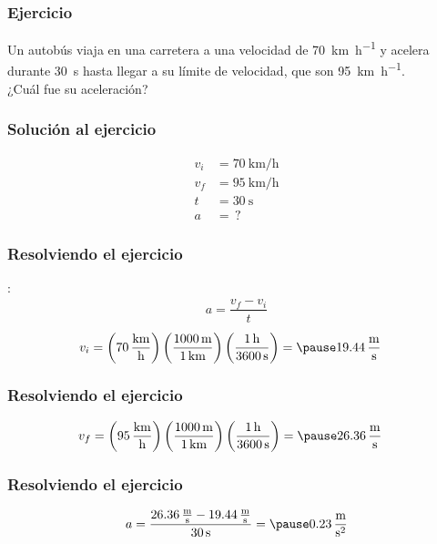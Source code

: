\documentclass[14pt]{beamer}
\begin{document}
\begin{frame}
\frametitle{Ejercicio}
Un autobús viaja en una carretera a una velocidad de \SI{70}{\kilo\meter\per\hour} y acelera durante \SI{30}{\second} hasta llegar a su límite de velocidad, que son \SI{95}{\kilo\meter\per\hour}.
\\
\bigskip
\pause
¿Cuál fue su aceleración?
\end{frame}
\begin{frame}
\frametitle{Solución al ejercicio}
\begin{align*}
v_{i} &= \SI{70}{\kilo\meter\per\hour} \\[0.5em]
v_{f} &= \SI{95}{\kilo\meter\per\hour} \\[0.5em]
t &= \SI{30}{\second} \\[0.5em]
a &= \, ?
\end{align*}
\end{frame}
\begin{frame}
\frametitle{Resolviendo el ejercicio}
:
\pause
\begin{align*}
a = \dfrac{v_{f} - v_{i}}{t}
\end{align*}
\pause
{}
\begin{eqnarray*}
\begin{aligned}
v_{i} &= \left( \SI[per-mode=fraction]{70}{\kilo\meter\per\hour} \right) \left( \dfrac{\SI{1000}{\meter}}{\SI{1}{\kilo\meter}} \right) \left( \dfrac{\SI{1}{\hour}}{\SI{3600}{\second}} \right) = \pause \SI[per-mode=fraction]{19.44}{\meter\per\second}
\end{aligned}
\end{eqnarray*}
\end{frame}
\begin{frame}
\frametitle{Resolviendo el ejercicio}
\begin{eqnarray*}
\begin{aligned}
v_{f} &= \left( \SI[per-mode=fraction]{95}{\kilo\meter\per\hour} \right) \left( \dfrac{\SI{1000}{\meter}}{\SI{1}{\kilo\meter}} \right) \left( \dfrac{\SI{1}{\hour}}{\SI{3600}{\second}} \right) = \pause \SI[per-mode=fraction]{26.36}{\meter\per\second}
\end{aligned}
\end{eqnarray*}
\end{frame}
\begin{frame}
\frametitle{Resolviendo el ejercicio}
\begin{eqnarray*}
\begin{aligned}
a = \dfrac{\SI[per-mode=fraction]{26.36}{\meter\per\second} - \SI[per-mode=fraction]{19.44}{\meter\per\second}}{\SI{30}{\second}} = \pause \SI[per-mode=fraction]{0.23}{\meter\per\square\second}
\end{aligned}
\end{eqnarray*}
\end{frame}
\end{document}
